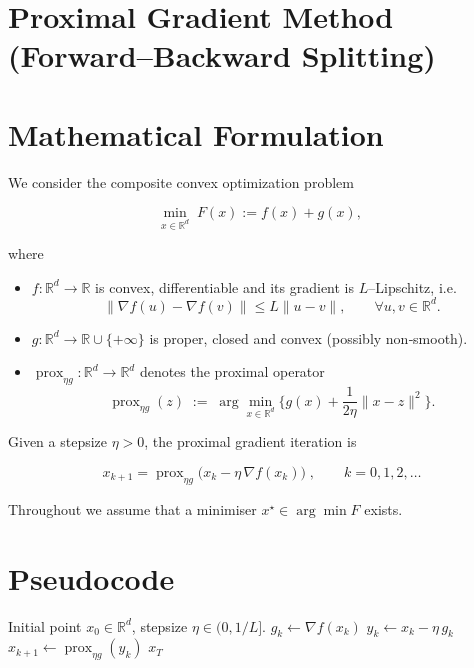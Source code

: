 \documentclass{article}
\newcommand{\prox}{\operatorname{prox}}
\newcommand{\grad}{\nabla}
\newcommand{\R}{\mathbb{R}}
\begin{document}
\section*{Proximal Gradient Method (Forward–Backward Splitting)}

\section*{Mathematical Formulation}
We consider the composite convex optimization problem  

\[
\min_{x\in\R^{d}} \; F(x):=f(x)+g(x),
\tag{P}
\]

where  

\begin{itemize}
    \item $f:\R^{d}\to\R$ is convex, differentiable and its gradient is $L$–Lipschitz, i.e.  
    \[
    \|\grad f(u)-\grad f(v)\|\le L\|u-v\|,\qquad\forall u,v\in\R^{d}.
    \tag{A1}
    \]
    \item $g:\R^{d}\to\R\cup\{+\infty\}$ is proper, closed and convex (possibly non‑smooth).  
    \item $\prox_{\eta g}:\R^{d}\to\R^{d}$ denotes the proximal operator
    \[
    \prox_{\eta g}(z)\;:=\;\arg\min_{x\in\R^{d}}\Big\{ g(x)+\frac1{2\eta}\|x-z\|^{2}\Big\}.
    \tag{A2}
    \]
\end{itemize}

Given a stepsize $\eta>0$, the proximal gradient iteration is  

\[
\boxed{\;x_{k+1}= \prox_{\eta g}\bigl(x_{k}-\eta\,\grad f(x_{k})\bigr)\;},\qquad k=0,1,2,\dots
\tag{1}
\]

Throughout we assume that a minimiser $x^{\star}\in\arg\min F$ exists.

\section*{Pseudocode}
\begin{algorithm}[H]
\caption{Proximal Gradient Method}
\begin{algorithmic}[1]
\Require Initial point $x_{0}\in\R^{d}$, stepsize $\eta\in(0,1/L]$.
    \State $g_{k}\gets \grad f(x_{k})$ 
    \State $y_{k}\gets x_{k}-\eta\,g_{k}$ 
    \State $x_{k+1}\gets \prox_{\eta g}(y_{k})$ 
\EndFor
\State \Return $x_{T}$
\end{algorithmic}
\end{algorithm}
\end{document}
